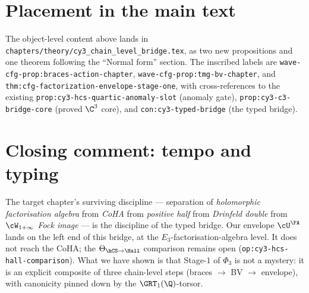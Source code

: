 \section*{Placement in the main text}

The object-level content above lands in
\texttt{chapters/theory/cy3\_chain\_level\_bridge.tex}, as two new
propositions and one theorem following the ``Normal form''
section. The inscribed labels are
\texttt{wave-cfg-prop:braces-action-chapter},
\texttt{wave-cfg-prop:tmg-bv-chapter}, and
\texttt{thm:cfg-factorization-envelope-stage-one}, with
cross-references to the existing
\texttt{prop:cy3-hcs-quartic-anomaly-slot} (anomaly gate),
\texttt{prop:cy3-c3-bridge-core} (proved $\C^3$ core), and
\texttt{con:cy3-typed-bridge} (the typed bridge).

\section*{Closing comment: tempo and typing}

The target chapter's surviving discipline --- separation of
\emph{holomorphic factorisation algebra} from \emph{CoHA} from
\emph{positive half} from \emph{Drinfeld double} from
\emph{$\cW_{1+\infty}$ Fock image} --- is the discipline of the
typed bridge. Our envelope $\cU^\FA$ lands on the left end of this
bridge, at the $E_3$-factorisation-algebra level. It does not reach
the CoHA; the $\Theta_{\hCS\to\Hall}$ comparison remains open
(\texttt{op:cy3-hcs-hall-comparison}). What we have shown is that
Stage-$1$ of $\Phi_3$ is not a mystery: it is an explicit composite
of three chain-level steps
(braces $\to$ BV $\to$ envelope), with canonicity pinned down by the
$\GRT_1(\Q)$-torsor.

